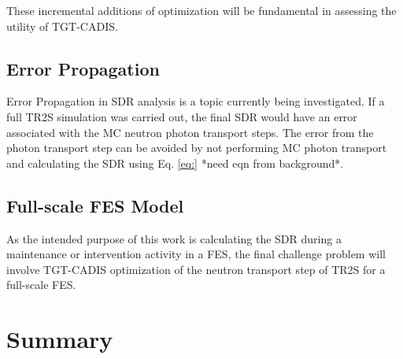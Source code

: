These incremental additions of optimization will be fundamental in assessing the
utility of TGT-CADIS. 





\subsection{Error Propagation}\label{sec:error}
Error Propagation in SDR analysis is a topic currently being investigated.
If a full TR2S simulation was carried out, the final SDR would have an error associated
with the MC neutron photon transport steps.  The error from the photon transport
step can be avoided by not performing MC photon transport and calculating the
SDR using Eq. \ref{eq:} *need eqn from background*.


\subsection{Full-scale FES Model} \label{sec:full_scale}
As the intended purpose of this work is  
calculating the SDR during a maintenance or
intervention activity in a FES, the final challenge problem will involve 
TGT-CADIS optimization of the neutron transport step of TR2S for a full-scale
FES.

\section{Summary}\label{sec:summary}

